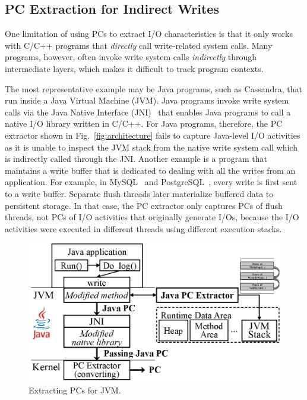 {%

\subsection{PC Extraction for Indirect Writes}
One limitation of using PCs to extract I/O characteristics is that it only
works with C/C++ programs that \textit{directly} call write-related system
calls.  Many programs, however, often invoke write system calls
\textit{indirectly} through intermediate layers, which makes it difficult to
track program contexts.

The most representative example may be Java programs, such as Cassandra, that
run inside a Java Virtual Machine (JVM). Java programs invoke write system
calls via the Java Native Interface (JNI)~\cite{JNI} that enables Java programs
to call a native I/O library written in C/C++.  For Java programs, therefore, the
PC extractor shown in Fig.~\ref{fig:architecture} fails to capture Java-level
I/O activities as it is unable to inspect the JVM stack from the native write
system call which is indirectly called through the JNI.  Another example is a
program that maintains a write buffer that is dedicated to dealing with all the
writes from an application. For example, in MySQL~\cite{MySQL} and
PostgreSQL~\cite{PostgreSQL}, every write is first sent to a write buffer.
Separate flush threads later materialize buffered data to persistent storage.
In that case, the PC extractor only captures PCs of flush threads, not PCs of
I/O activities that originally generate I/Os, because the I/O activities were
executed in different threads using different execution stacks.

\begin{figure}[t]
\centering
	\includegraphics[width=0.9\linewidth]{figure/jvmpc}
	\vspace{-5pt}
	\caption{Extracting PCs for JVM.}
\label{fig:java}
	\vspace{-10pt}
\end{figure}

}
